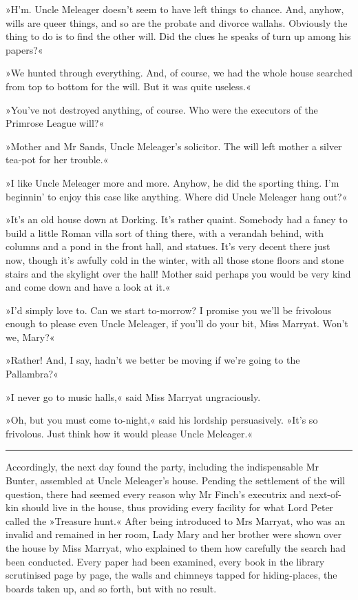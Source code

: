 »H'm. Uncle Meleager doesn't seem to have left things to chance. And, anyhow, wills are queer things, and so are the probate and divorce wallahs. Obviously the thing to do is to find the other will. Did the clues he speaks of turn up among his papers?«

»We hunted through everything. And, of course, we had the whole house searched from top to bottom for the will. But it was quite useless.«

»You've not destroyed anything, of course. Who were the executors of the Primrose League will?«

»Mother and Mr Sands, Uncle Meleager's solicitor. The will left mother a silver tea-pot for her trouble.«

»I like Uncle Meleager more and more. Anyhow, he did the sporting thing. I'm beginnin' to enjoy this case like anything. Where did Uncle Meleager hang out?«

»It's an old house down at Dorking. It's rather quaint. Somebody had a fancy to build a little Roman villa sort of thing there, with a verandah behind, with columns and a pond in the front hall, and statues. It's very decent there just now, though it's awfully cold in the winter, with all those stone floors and stone stairs and the skylight over the hall! Mother said perhaps you would be very kind and come down and have a look at it.«

»I'd simply love to. Can we start to-morrow? I promise you we'll be frivolous enough to please even Uncle Meleager, if you'll do your bit, Miss Marryat. Won't we, Mary?«

»Rather! And, I say, hadn't we better be moving if we're going to the Pallambra?«

»I never go to music halls,« said Miss Marryat ungraciously.

»Oh, but you must come to-night,« said his lordship persuasively. »It's so frivolous. Just think how it would please Uncle Meleager.«

\noindent\hfil\rule{0.5\textwidth}{.4pt}\hfil 

Accordingly, the next day found the party, including the indispensable Mr Bunter, assembled at Uncle Meleager's house. Pending the settlement of the will question, there had seemed every reason why Mr Finch's executrix and next-of-kin should live in the house, thus providing every facility for what Lord Peter called the »Treasure hunt.« After being introduced to Mrs Marryat, who was an invalid and remained in her room, Lady Mary and her brother were shown over the house by Miss Marryat, who explained to them how carefully the search had been conducted. Every paper had been examined, every book in the library scrutinised page by page, the walls and chimneys tapped for hiding-places, the boards taken up, and so forth, but with no result.

